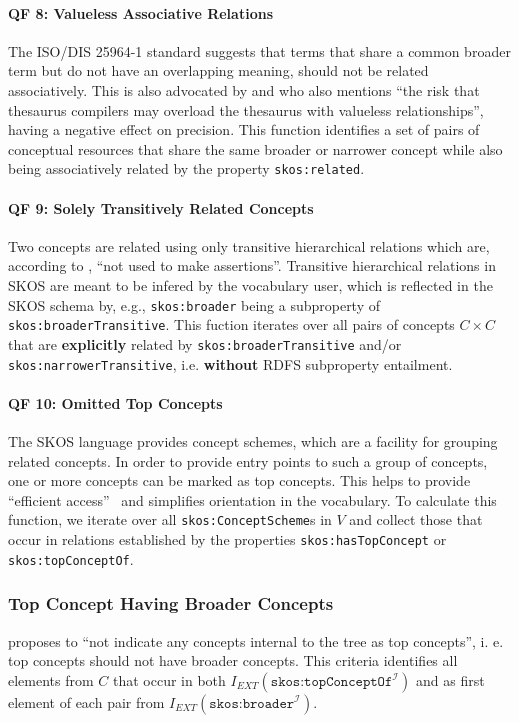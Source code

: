 \paragraph{\textbf{QF 8: Valueless Associative Relations}}
The ISO/DIS 25964-1 standard suggests that terms that share a common broader term but do not have an overlapping meaning, should not be related associatively. This is also advocated by \cite{Hedden2010} and \cite{Aitchison2000} who also mentions ``the risk that thesaurus compilers may overload the thesaurus with valueless relationships'', having a negative effect on precision. This function identifies a set of pairs of conceptual resources that share the same broader or narrower concept while also being associatively related by the property \texttt{skos:related}.

\paragraph{\textbf{QF 9: Solely Transitively Related Concepts}}
Two concepts are related using only transitive hierarchical relations which are, according to \cite{SkosReference2008}, ``not used to make assertions''. Transitive hierarchical relations in SKOS are meant to be infered by the vocabulary user, which is reflected in the SKOS schema by, e.g., \texttt{skos:broader} being a subproperty of \texttt{skos:broaderTransitive}. This fuction iterates over all pairs of concepts $C \times C$ that are \textbf{explicitly} related by \texttt{skos:broaderTransitive} and/or \texttt{skos:narrowerTransitive}, i.e. \textbf{without} RDFS subproperty entailment.

\paragraph{\textbf{QF 10: Omitted Top Concepts}}
The SKOS language provides concept schemes, which are a facility for grouping related concepts. In order to provide entry points to such a group of concepts, one or more concepts can be marked as top concepts. This helps to provide ``efficient access''~\cite{Isaac2009} and simplifies orientation in the vocabulary. To calculate this function, we iterate over all \texttt{skos:ConceptScheme}s in $V$ and collect those that occur in relations established by the properties \texttt{skos:hasTopConcept} or \texttt{skos:topConceptOf}.

\subsubsection{Top Concept Having Broader Concepts}
\cite{Allemang2011} proposes to ``not indicate any concepts internal to the tree as top concepts'', i. e. top concepts should not have broader concepts. This criteria identifies all elements from $C$ that occur in both $I_{EXT}(\texttt{skos:topConceptOf}^\mathcal{I})$ and as first element of each pair from $I_{EXT}(\texttt{skos:broader}^\mathcal{I})$.

